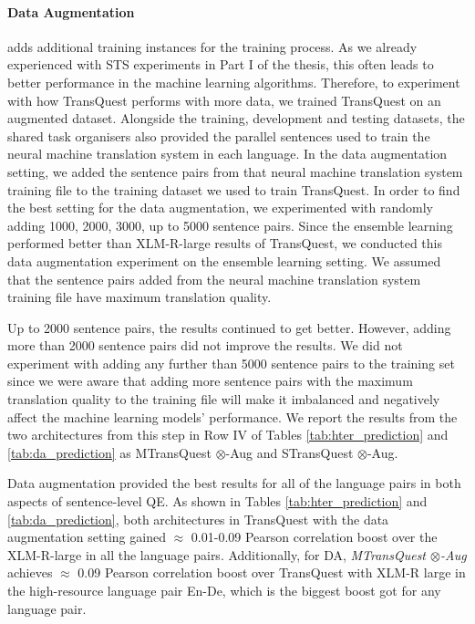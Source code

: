 \paragraph{Data Augmentation} adds additional training instances for the training process. As we already experienced with STS experiments in Part I of the thesis, this often leads to better performance in the machine learning algorithms. Therefore, to experiment with how TransQuest performs with more data, we trained TransQuest on an augmented dataset. Alongside the training, development and testing datasets, the shared task organisers also provided the parallel sentences used to train the neural machine translation system in each language. In the data augmentation setting, we added the sentence pairs from that neural machine translation system training file to the training dataset we used to train TransQuest. In order to find the best setting for the data augmentation, we experimented with randomly adding 1000, 2000, 3000, up to 5000 sentence pairs. Since the ensemble learning performed better than XLM-R-large results of TransQuest, we conducted this data augmentation experiment on the ensemble learning setting. We assumed that the sentence pairs added from the neural machine translation system training file have maximum translation quality. 

Up to 2000 sentence pairs, the results continued to get better. However, adding more than 2000 sentence pairs did not improve the results. We did not experiment with adding any further than 5000 sentence pairs to the training set since we were aware that adding more sentence pairs with the maximum translation quality to the training file will make it imbalanced and negatively affect the machine learning models' performance. We report the results from the two architectures from this step in Row IV of Tables \ref{tab:hter_prediction} and \ref{tab:da_prediction} as MTransQuest $\otimes$-Aug and STransQuest $\otimes$-Aug. 


Data augmentation provided the best results for all of the language pairs in both aspects of sentence-level QE. As shown in Tables \ref{tab:hter_prediction} and \ref{tab:da_prediction}, both architectures in TransQuest with the data augmentation setting gained $\approx$ 0.01-0.09 Pearson correlation boost over the XLM-R-large in all the language pairs. Additionally, for DA, \textit{MTransQuest $\otimes$-Aug} achieves $\approx$ 0.09 Pearson correlation boost over TransQuest with XLM-R large in the high-resource language pair En-De, which is the biggest boost got for any language pair. 

